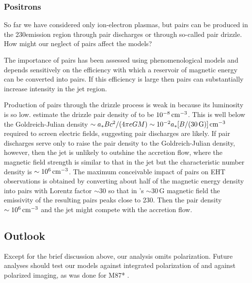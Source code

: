 \subsubsection{Positrons}\label{sec:pair}

So far we have considered only ion-electron plasmas, but pairs can be produced in the 230\GHz emission region through pair discharges or through so-called pair drizzle.
How might our neglect of pairs affect the models?

The importance of pairs has been assessed using phenomenological models \citep{2020ApJ...896...30A, 2021ApJ...923..272E} and depends sensitively on the efficiency with which a reservoir of magnetic energy can be converted into pairs.
If this efficiency is large then pairs can substantially increase intensity in the jet region.

Production of pairs through the drizzle process is weak in \sgra because its luminosity is so low.
\cite[][see also \citealt{2021ApJ...907...73W}]{2011ApJ...735....9M} estimate the drizzle pair density of \sgra to be $10^{-8}\,\mathrm{cm}^{-3}$.
This is well below the Goldreich-Julian density $\sim a_* B c^2/(4 \pi e G M) \sim 10^{-2} a_* [B/(30\,{\rm G})] \,\mathrm{cm}^{-3}$ required to screen electric fields, suggesting pair discharges are likely.
If pair discharges serve only to raise the pair density to the Goldreich-Julian density, however, then the jet is unlikely to outshine the accretion flow, where the magnetic field strength is similar to that in the jet but the characteristic number density is $\sim 10^6 \,\mathrm{cm}^{-3}$.
The maximum conceivable impact of pairs on EHT observations is obtained by converting about half of the magnetic energy density into pairs with Lorentz factor $\sim 30$ so that in \sgra's $\sim 30$\,G magnetic field the emissivity of the resulting pairs peaks close to 230\GHz.
Then the pair density $\sim 10^{6} \,\mathrm{cm}^{-3}$ and the jet might compete with the accretion flow.

\subsection{Outlook}\label{sec:future}

Except for the brief discussion above, our analysis omits polarization.
Future analyses should test our models against integrated polarization of \sgra \citep{2021ApJ...910L..14G} and against polarized imaging, as was done for M87* .

